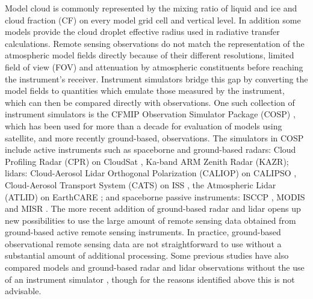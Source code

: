 Model cloud is commonly represented by the mixing ratio of liquid and ice
and cloud fraction (CF) on every model grid cell and vertical level.
In addition some models provide the cloud droplet effective radius used in
radiative transfer calculations.
Remote sensing observations do not match the representation of the atmospheric
model fields directly because of their different resolutions, limited
field of view (FOV) and attenuation by atmospheric constituents before
reaching the instrument's receiver. Instrument simulators bridge this
gap by converting the model fields to quantities which emulate those measured by the instrument,
which can then be compared directly with observations. One such collection of instrument
simulators is the CFMIP
Observation Simulator Package (COSP) \citep{bodas-salcedo2011,swales2018},
which has been used for more than a decade for evaluation
of models using satellite, and more recently ground-based, observations.
The simulators in COSP include active instruments such as spaceborne and
ground-based radars: Cloud Profiling Radar (CPR) on CloudSat \citep{stephens2002}, Ka-band ARM Zenith Radar (KAZR); lidars:
Cloud-Aerosol Lidar Orthogonal Polarization (CALIOP) on CALIPSO \citep{winker2009}, Cloud-Aerosol Transport System (CATS) on ISS \citep{mcgill2015}, the Atmospheric Lidar (ATLID) on EarthCARE \citep{illingworth2015}; and spaceborne passive instruments:
ISCCP \citep{rossow1991}, MODIS \citep{parkinson2003} and MISR \citep{diner1998}. The more recent addition of ground-based radar
\citep{zhang2018} and lidar \citep{chiriaco2018,bastin2018}
opens up new possibilities to use the large amount of remote sensing data
obtained from ground-based active remote sensing instruments. In practice,
ground-based observational remote sensing data are not straightforward to use
without a substantial amount of additional processing. Some previous studies
have also compared models and ground-based radar and lidar observations
without the use of an instrument simulator \citep{bouniol2010,hansen2018}, though for the reasons identified above this is not advisable.


